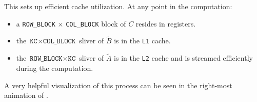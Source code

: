 \documentclass{article}
\newcommand{\MYhref}[3][blue]{\href{#2}{\color{#1}{#3}}}%
\begin{document}
This sets up efficient cache utilization. At any point in the computation:
\begin{itemize}
    \item a \texttt{ROW\_BLOCK} $\times$ \texttt{COL\_BLOCK} block of $C$ resides in registers.
    \item the $\texttt{KC} \times \texttt{COL\_BLOCK}$ sliver of $\widetilde{B}$ is in the \texttt{L1} cache.
    \item the $\texttt{ROW\_BLOCK} \times \texttt{KC}$ sliver of $\widetilde{A}$ is in the \texttt{L2} cache and is streamed efficiently during the computation.
\end{itemize}
A very helpful visualization of this process can be seen in the right-most 
animation of \MYhref{https://jukkasuomela.fi/cache-blocking-demo/}{this animated HTML page}.
\end{document}

